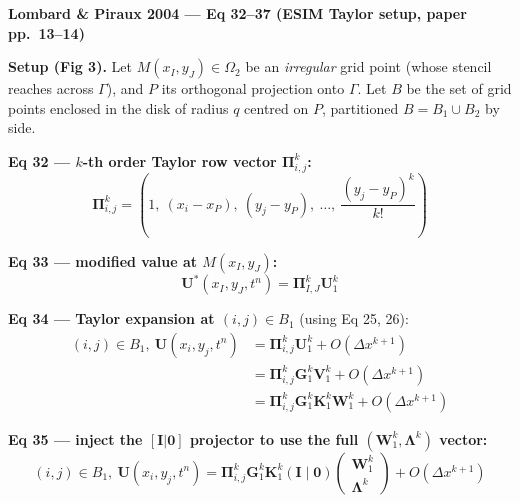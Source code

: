\textbf{Lombard \& Piraux 2004 --- Eq 32--37 (ESIM Taylor setup, paper pp.\ 13--14)}

\medskip

\textbf{Setup (Fig 3).} Let $M(x_I, y_J) \in \Omega_2$ be an
\emph{irregular} grid point (whose stencil reaches across $\Gamma$),
and $P$ its orthogonal projection onto $\Gamma$. Let $B$ be the set
of grid points enclosed in the disk of radius $q$ centred on $P$,
partitioned $B = B_1 \cup B_2$ by side.

\medskip

\textbf{Eq 32 --- $k$-th order Taylor row vector $\boldsymbol{\Pi}_{i,j}^k$:}
\begin{equation*}
  \boldsymbol{\Pi}_{i,j}^k =
  \left( 1,\ (x_i - x_P),\ (y_j - y_P),\ \ldots,\ \frac{(y_j - y_P)^k}{k!} \right)
  \tag{32}
\end{equation*}

\textbf{Eq 33 --- modified value at $M(x_I, y_J)$:}
\begin{equation*}
  \boldsymbol{U}^*(x_I, y_J, t^n)
  = \boldsymbol{\Pi}_{I,J}^k \boldsymbol{U}_1^k
  \tag{33}
\end{equation*}

\medskip

\textbf{Eq 34 --- Taylor expansion at $(i, j) \in B_1$} (using Eq 25, 26):
\begin{equation*}
\begin{aligned}
  (i,j) \in B_1,\ \boldsymbol{U}(x_i, y_j, t^n)
  &= \boldsymbol{\Pi}_{i,j}^k \boldsymbol{U}_1^k + O(\Delta x^{k+1}) \\
  &= \boldsymbol{\Pi}_{i,j}^k \boldsymbol{G}_1^k \boldsymbol{V}_1^k + O(\Delta x^{k+1}) \\
  &= \boldsymbol{\Pi}_{i,j}^k \boldsymbol{G}_1^k \boldsymbol{K}_1^k \boldsymbol{W}_1^k + O(\Delta x^{k+1})
\end{aligned}
\tag{34}
\end{equation*}

\textbf{Eq 35 --- inject the $[\boldsymbol{I} | \boldsymbol{0}]$ projector
to use the full $(\boldsymbol{W}_1^k, \boldsymbol{\Lambda}^k)$ vector:}
\begin{equation*}
  (i,j) \in B_1,\ \boldsymbol{U}(x_i, y_j, t^n)
  = \boldsymbol{\Pi}_{i,j}^k \boldsymbol{G}_1^k \boldsymbol{K}_1^k
  (\boldsymbol{I} \mid \boldsymbol{0})
  \begin{pmatrix} \boldsymbol{W}_1^k \\ \boldsymbol{\Lambda}^k \end{pmatrix}
  + O(\Delta x^{k+1})
  \tag{35}
\end{equation*}

